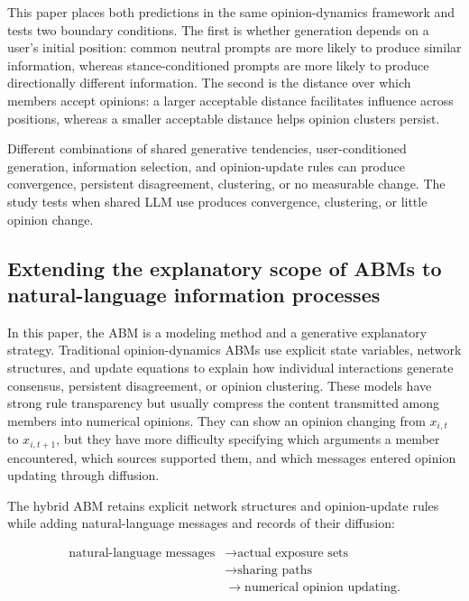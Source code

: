 \documentclass[11pt,a4paper]{article}
\begin{document}
This paper places both predictions in the same opinion-dynamics framework and tests two boundary conditions. The first is whether generation depends on a user's initial position: common neutral prompts are more likely to produce similar information, whereas stance-conditioned prompts are more likely to produce directionally different information. The second is the distance over which members accept opinions: a larger acceptable distance facilitates influence across positions, whereas a smaller acceptable distance helps opinion clusters persist.

Different combinations of shared generative tendencies, user-conditioned generation, information selection, and opinion-update rules can produce convergence, persistent disagreement, clustering, or no measurable change. The study tests when shared LLM use produces convergence, clustering, or little opinion change.

\subsection{Extending the explanatory scope of ABMs to natural-language information processes}

In this paper, the ABM is a modeling method and a generative explanatory strategy. Traditional opinion-dynamics ABMs use explicit state variables, network structures, and update equations to explain how individual interactions generate consensus, persistent disagreement, or opinion clustering. These models have strong rule transparency but usually compress the content transmitted among members into numerical opinions. They can show an opinion changing from $x_{i,t}$ to $x_{i,t+1}$, but they have more difficulty specifying which arguments a member encountered, which sources supported them, and which messages entered opinion updating through diffusion.

The hybrid ABM retains explicit network structures and opinion-update rules while adding natural-language messages and records of their diffusion:

\begin{equation*}
\begin{aligned}\text{natural-language messages} &\rightarrow \text{actual exposure sets} \\
&\rightarrow \text{sharing paths} \\
&\rightarrow \text{numerical opinion updating}.\end{aligned}
\end{equation*}
\end{document}
